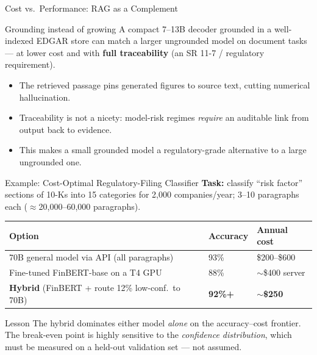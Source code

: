\documentclass[9pt,t]{beamer}
\begin{document}
\begin{frame}{Cost vs.\ Performance: RAG as a Complement}
\begin{block}{Grounding instead of growing}
A compact 7--13B decoder grounded in a well-indexed EDGAR store can match a larger
ungrounded model on document tasks --- at lower cost and with \textbf{full
traceability} (an SR 11-7 / regulatory requirement).
\end{block}

\medskip
\begin{itemize}
  \item The retrieved passage pins generated figures to source text, cutting
        numerical hallucination.
  \item Traceability is not a nicety: model-risk regimes \emph{require} an auditable
        link from output back to evidence.
  \item This makes a small grounded model a regulatory-grade alternative to a large
        ungrounded one.
\end{itemize}
\end{frame}

\begin{frame}{Example: Cost-Optimal Regulatory-Filing Classifier}
\textbf{Task:} classify ``risk factor'' sections of 10-Ks into 15 categories for
2{,}000 companies/year; 3--10 paragraphs each ($\approx$20{,}000--60{,}000 paragraphs).

\medskip
\begin{tabular}{lll}
\toprule
\textbf{Option} & \textbf{Accuracy} & \textbf{Annual cost} \\
\midrule
70B general model via API (all paragraphs) & 93\% & \$200--\$600 \\
Fine-tuned FinBERT-base on a T4 GPU         & 88\% & $\sim$\$400 server \\
\textbf{Hybrid} (FinBERT + route 12\% low-conf.\ to 70B) & \textbf{92\%+} & $\sim$\textbf{\$250} \\
\bottomrule
\end{tabular}

\medskip
\begin{alertblock}{Lesson}
The hybrid dominates either model \emph{alone} on the accuracy--cost frontier. The
break-even point is highly sensitive to the \emph{confidence distribution}, which must
be measured on a held-out validation set --- not assumed.
\end{alertblock}
\end{frame}

\end{document}
